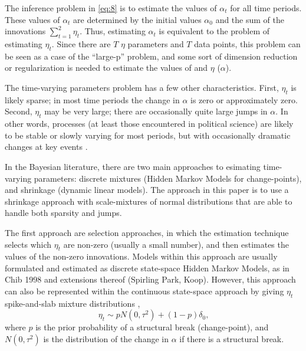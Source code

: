 \documentclass{article}
\begin{document}
The inference problem in \eqref{eq:8} is to estimate the values of $\alpha_{t}$ for all time periods.
These values of $\alpha_{t}$ are determined by the initial values $\alpha_{0}$ and the sum of the innovations $\sum_{t=1}^{2} \eta_{t}$.
Thus, estimating $\alpha_{t}$ is equivalent to the problem of estimating $\eta_{t}$.
Since there are $T$ $\eta$ parameters and $T$ data points, this problem can be seen as a case of the ``large-p'' problem, and some sort of dimension reduction or regularization is needed to estimate the values of and $\eta$ ($\alpha$).

The time-varying parameters problem has a few other characteristics. 
First, $\eta_{t}$ is likely sparse; in most time periods the change in $\alpha$ is zero or approximately zero.
Second, $\eta_{t}$ may be very large; there are occasionally quite large jumps in $\alpha$.
In other words, processes (at least those encountered in political science) are likely to be stable or slowly varying for most periods, but with occasionally dramatic changes at key events \parencite{RatkovicEng2010}.

In the Bayesian literature, there are two main approaches to esimating time-varying parameters: discrete mixtures (Hidden Markov Models for change-points), and shrinkage (dynamic linear models).
The approach in this paper is to use a shrinkage approach with scale-mixtures of normal distributions that are able to handle both sparsity and jumps.

The first approach are selection approaches, in which the estimation technique selects which $\eta_{t}$ are non-zero (usually a small number), and then estimates the values of the non-zero innovations.
Models within this approach are usually formulated and estimated as discrete state-space Hidden Markov Models, as in Chib 1998 and extensions thereof (Spirling Park, Koop).
However, this approach can also be represented within the continuous state-space approach by giving $\eta_{t}$ spike-and-slab mixture distributions \parencite{GiordaniKohn2008},
\begin{equation}
  \label{eq:1}
  \eta_{t} \sim p N(0, \tau^{2}) + (1 - p) \delta_{0} \text{,}
\end{equation}
where $p$ is the prior probability of a structural break (change-point), and $N(0, \tau^{2})$ is the distribution of the change in $\alpha$ if there is a structural break.
\end{document}
